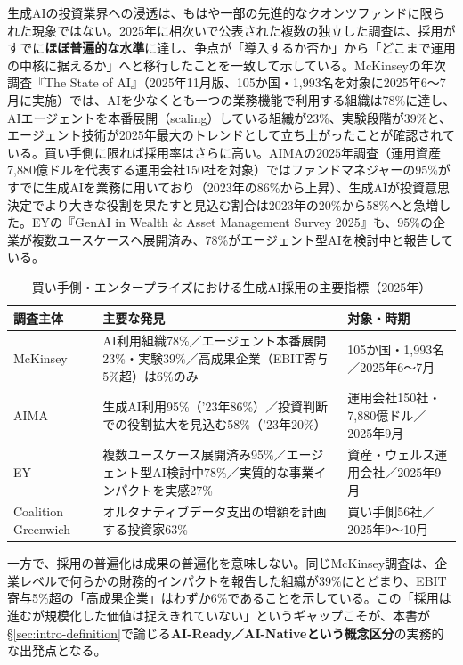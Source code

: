 生成AIの投資業界への浸透は、もはや一部の先進的なクオンツファンドに限られた現象ではない。2025年に相次いで公表された複数の独立した調査は、採用がすでに\textbf{ほぼ普遍的な水準}に達し、争点が「導入するか否か」から「どこまで運用の中核に据えるか」へと移行したことを一致して示している。McKinseyの年次調査『The State of AI』（2025年11月版、105か国・1,993名を対象に2025年6〜7月に実施）では、AIを少なくとも一つの業務機能で利用する組織は78\%に達し、AIエージェントを本番展開（scaling）している組織が23\%、実験段階が39\%と、エージェント技術が2025年最大のトレンドとして立ち上がったことが確認されている\cite{x01mckinsey2025stateofai}。買い手側に限れば採用率はさらに高い。AIMAの2025年調査（運用資産7,880億ドルを代表する運用会社150社を対象）ではファンドマネジャーの95\%がすでに生成AIを業務に用いており（2023年の86\%から上昇）、生成AIが投資意思決定でより大きな役割を果たすと見込む割合は2023年の20\%から58\%へと急増した\cite{x01aima2025}。EYの『GenAI in Wealth \& Asset Management Survey 2025』も、95\%の企業が複数ユースケースへ展開済み、78\%がエージェント型AIを検討中と報告している\cite{x01ey2025genai}。

\begin{table}[htbp]
\centering
\small
\caption{買い手側・エンタープライズにおける生成AI採用の主要指標（2025年）}
\label{tab:intro-adoption}
\begin{tabular}{@{}p{34mm}p{58mm}p{34mm}@{}}
\toprule
\textbf{調査主体} & \textbf{主要な発見} & \textbf{対象・時期} \\
\midrule
McKinsey \cite{x01mckinsey2025stateofai} & AI利用組織78\%／エージェント本番展開23\%・実験39\%／高成果企業（EBIT寄与5\%超）は6\%のみ & 105か国・1,993名／2025年6〜7月 \\
AIMA \cite{x01aima2025} & 生成AI利用95\%（'23年86\%）／投資判断での役割拡大を見込む58\%（'23年20\%） & 運用会社150社・7,880億ドル／2025年9月 \\
EY \cite{x01ey2025genai} & 複数ユースケース展開済み95\%／エージェント型AI検討中78\%／実質的な事業インパクトを実感27\% & 資産・ウェルス運用会社／2025年9月 \\
Coalition Greenwich \cite{altdata2025} & オルタナティブデータ支出の増額を計画する投資家63\% & 買い手側56社／2025年9〜10月 \\
\bottomrule
\end{tabular}
\end{table}

一方で、採用の普遍化は成果の普遍化を意味しない。同じMcKinsey調査は、企業レベルで何らかの財務的インパクトを報告した組織が39\%にとどまり、EBIT寄与5\%超の「高成果企業」はわずか6\%であることを示している\cite{x01mckinsey2025stateofai}。この「採用は進むが規模化した価値は捉えきれていない」というギャップこそが、本書が\S\ref{sec:intro-definition}で論じる\textbf{AI-Ready／AI-Nativeという概念区分}の実務的な出発点となる。

